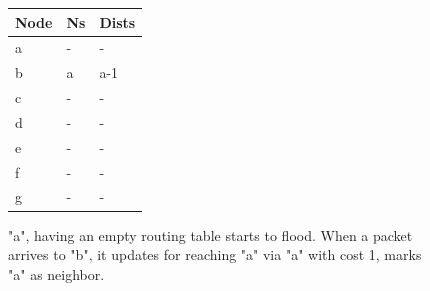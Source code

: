 \documentclass[12pt, oneandhalf, chaparabic, sees, ms]{metu}
\begin{document}

 
\begin{center}
 \begin{figure}[!htp]
  \begin{center}
   \noindent \begin{minipage}{.7\textwidth}
   \end{minipage}%
   \hfill
    \noindent \begin{minipage}{0.3\textwidth}
    \begin{tabular}{ | l | l | l | }
    \hline
    \rowcolor{lightgray}
    Node & Ns & Dists \\ \hline \hline
    a    & -  & -     \\ \hline
    \rowcolor{black!50}
    b    & a  & a-1   \\ \hline
    c    & -  & -     \\ \hline
    d    & -  & -     \\ \hline
    e    & -  & -     \\ \hline
    f    & -  & -     \\ \hline
    g    & -  & -     \\
    \hline
   \end{tabular}
   \end{minipage}
   
   \end{center}
    \caption{"a", having an empty routing table starts to flood. 
    When a packet arrives to "b", it updates for reaching "a" via "a" with cost 1, marks "a" as neighbor.}
    \label{fig:lagoon-graph2}
  \end{figure}
\end{center}
  
\end{document}
